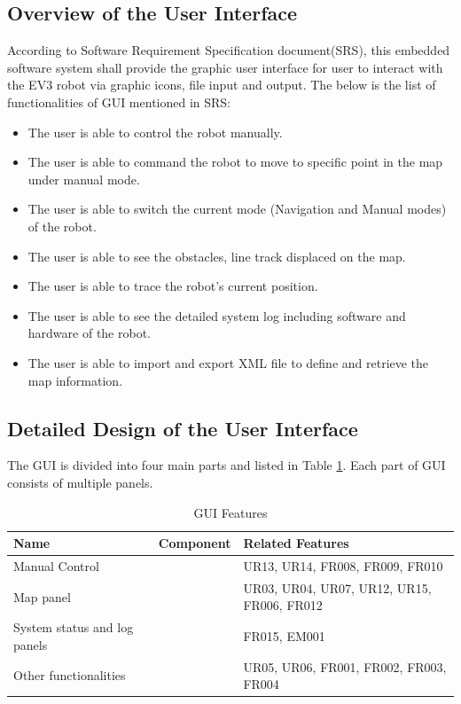 \subsection{Overview of the User Interface}
According to Software Requirement Specification document(SRS), this embedded software system shall provide the graphic user interface for user to interact with the EV3 robot via graphic icons, file input and output. The below is the list of functionalities of GUI mentioned in SRS:
\begin{itemize}
	\item The user is able to control the robot manually.
	\item The user is able to command the robot to move to specific point in the map under manual mode.
	\item The user is able to switch the current mode (Navigation and Manual modes) of the robot.
	\item The user is able to see the obstacles, line track displaced on the map.
	\item The user is able to trace the robot's current position.
	\item The user is able to see the detailed system log including software and hardware of the robot.
	\item The user is able to import and export XML file to define and retrieve the map information.
\end{itemize}

\subsection{Detailed Design of the User Interface}
The GUI is divided into four main parts and listed in Table \ref{GUI Features}. Each part of GUI consists of multiple panels.

\begin{table}[]
	\centering
	\caption{GUI Features}
	\label{GUI Features}
	\begin{tabular}{|p{3cm}|p{2cm}|p{6cm}|}
		\hline
		Name & Component & Related Features \\ \hline
		Manual Control &  & UR13, UR14, FR008, FR009, FR010 \\ \hline
		Map panel  &  & UR03, UR04, UR07, UR12, UR15, FR006, FR012 \\ \hline
		System status and log panels &  & FR015, EM001 \\ \hline
		Other functionalities &  &  UR05, UR06, FR001, FR002, FR003, FR004 \\ \hline
	\end{tabular}
\end{table}

